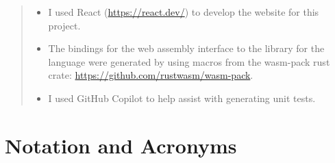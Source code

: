 \begin{quote}
\noindent
\begin{itemize}
\item I used React (\url{https://react.dev/}) to develop the website for this project.
\item The bindings for the web assembly interface to the library for the language were generated by using macros from the wasm-pack rust crate: \url{https://github.com/rustwasm/wasm-pack}.
\item I used GitHub Copilot to help assist with generating unit tests.
\end{itemize}
\end{quote}


\chapter*{Notation and Acronyms}
\begin{acronym}
\end{acronym}